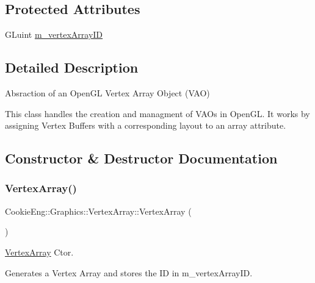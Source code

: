 \subsection*{Protected Attributes}
\begin{DoxyCompactItemize}
\item 
G\+Luint \hyperlink{class_cookie_eng_1_1_graphics_1_1_vertex_array_ad4ee57cc45e85deb47a9f2e6a91211a9}{m\+\_\+vertex\+Array\+ID}
\end{DoxyCompactItemize}


\subsection{Detailed Description}
Absraction of an Open\+GL Vertex Array Object (V\+AO) 

This class handles the creation and managment of V\+A\+Os in Open\+GL. It works by assigning Vertex Buffers with a corresponding layout to an array attribute. 

\subsection{Constructor \& Destructor Documentation}
\mbox{\label{class_cookie_eng_1_1_graphics_1_1_vertex_array_a9ca1229bf83878acd80e947487b2a9ac}} 
\subsubsection{\texorpdfstring{Vertex\+Array()}{VertexArray()}}
{\footnotesize\ttfamily Cookie\+Eng\+::\+Graphics\+::\+Vertex\+Array\+::\+Vertex\+Array (\begin{DoxyParamCaption}{ }\end{DoxyParamCaption})}



\hyperlink{class_cookie_eng_1_1_graphics_1_1_vertex_array}{Vertex\+Array} Ctor. 

Generates a Vertex Array and stores the ID in m\+\_\+vertex\+Array\+ID. \mbox{\label{class_cookie_eng_1_1_graphics_1_1_vertex_array_a114da6690772eaa07108e2dccaa8e93d}} 
